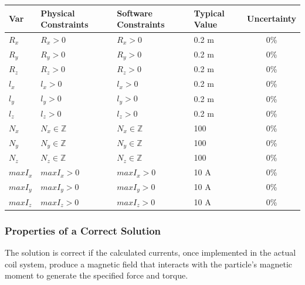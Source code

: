 \documentclass[12pt]{article}
\begin{document}
\begin{table}[H]
  \caption{Input Variables} \label{TblInputVar}
  \renewcommand{\arraystretch}{1.2}
\noindent \begin{longtable*}{l l l l c} 
  \toprule
  \textbf{Var} & \textbf{Physical Constraints} & \textbf{Software Constraints} &
                             \textbf{Typical Value} & \textbf{Uncertainty}\\
  \midrule 

  $R_x$ & $R_x > 0$ & $R_x > 0$ & 0.2 \si{\metre} & 0\% \\
  $R_y$ & $R_y > 0$ & $R_y > 0$ & 0.2 \si{\metre} & 0\% \\
  $R_z$ & $R_z > 0$ & $R_z > 0$ & 0.2 \si{\metre} & 0\% \\
  $l_x$ & $l_x > 0$ & $l_x > 0$ & 0.2 \si{\metre} & 0\% \\
  $l_y$ & $l_y > 0$ & $l_y > 0$ & 0.2 \si{\metre} & 0\% \\
  $l_z$ & $l_z > 0$ & $l_z > 0$ & 0.2 \si{\metre} & 0\% \\
  $N_x$ & $N_x \in \mathbb{Z}$ & $N_x \in \mathbb{Z}$ & 100 & 0\% \\
  $N_y$ & $N_y \in \mathbb{Z}$ &  $N_y \in \mathbb{Z}$ & 100 & 0\% \\
  $N_z$ & $N_z \in \mathbb{Z}$ & $N_z \in \mathbb{Z}$ & 100 & 0\% \\
  $maxI_x$ & $maxI_x > 0$ & $maxI_x > 0$  & 10 \si{\ampere} & 0\% \\
  $maxI_y$ &  $maxI_y > 0$ &  $maxI_y > 0$ & 10 \si{\ampere} & 0\% \\
  $maxI_z$ &  $maxI_z > 0$ &$maxI_z > 0$ & 10 \si{\ampere} & 0\% \\

  \bottomrule
\end{longtable*}
\end{table}

\subsubsection{Properties of a Correct Solution} \label{sec_CorrectSolution}

\noindent
 The solution is correct if the calculated currents, once implemented in the actual coil system, produce a magnetic field that interacts with the particle's magnetic moment to generate the specified force and torque.
\end{document}
